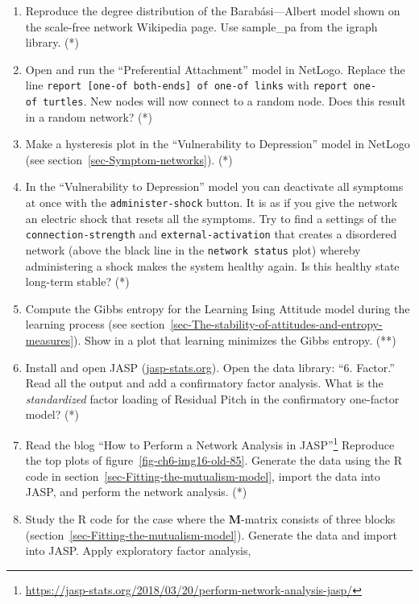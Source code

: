 \documentclass[
  a4paper,
  DIV=11,
  numbers=noendperiod,
  oneside]{scrreprt}
\begin{document}
\begin{enumerate}
\def\labelenumi{\arabic{enumi})}
\item
  Reproduce the degree distribution of the Barabási---Albert model shown
  on the scale-free network Wikipedia page. Use sample\_pa from the
  igraph library. (*)
\item
  Open and run the ``Preferential Attachment'' model in NetLogo. Replace
  the line \texttt{report\ {[}one-of\ both-ends{]}\ of\ one-of\ links}
  with \texttt{report\ one-of\ turtles}. New nodes will now connect to a
  random node. Does this result in a random network? (*)
\item
  Make a hysteresis plot in the ``Vulnerability to Depression'' model in
  NetLogo (see section~\ref{sec-Symptom-networks}). (*)
\item
  In the ``Vulnerability to Depression'' model you can deactivate all
  symptoms at once with the \texttt{administer-shock} button. It is as
  if you give the network an electric shock that resets all the
  symptoms. Try to find a settings of the \texttt{connection-strength}
  and \texttt{external-activation} that creates a disordered network
  (above the black line in the \texttt{network\ status} plot) whereby
  administering a shock makes the system healthy again. Is this healthy
  state long-term stable? (*)
\item
  Compute the Gibbs entropy for the Learning Ising Attitude model during
  the learning process (see
  section~\ref{sec-The-stability-of-attitudes-and-entropy-measures}).
  Show in a plot that learning minimizes the Gibbs entropy. (**)
\item
  Install and open JASP (\url{jasp-stats.org}). Open the data library:
  ``6. Factor.'' Read all the output and add a confirmatory factor
  analysis. What is the \emph{standardized} factor loading of Residual
  Pitch in the confirmatory one-factor model? (*)
\item
  Read the blog ``How to Perform a Network Analysis in JASP''\footnote{\url{https://jasp-stats.org/2018/03/20/perform-network-analysis-jasp/}}
  Reproduce the top plots of figure~\ref{fig-ch6-img16-old-85}. Generate
  the data using the R code in
  section~\ref{sec-Fitting-the-mutualism-model}, import the data into
  JASP, and perform the network analysis. (*)
\item
  Study the R code for the case where the \textbf{M}-matrix consists of
  three blocks (section~\ref{sec-Fitting-the-mutualism-model}). Generate
  the data and import into JASP. Apply exploratory factor analysis,

\end{enumerate}
\end{document}
